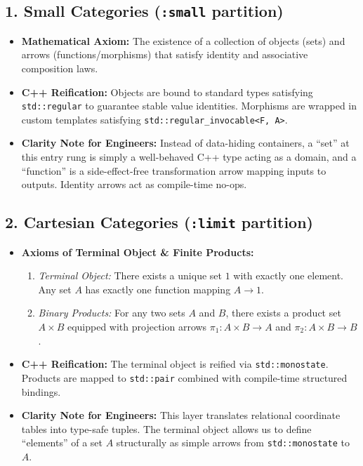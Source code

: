 \subsection{1. Small Categories (\texttt{:small} partition)}
\begin{itemize}
    \item \textbf{Mathematical Axiom:} The existence of a collection of objects (sets) and arrows (functions/morphisms) that satisfy identity and associative composition laws.
    \item \textbf{C++ Reification:} Objects are bound to standard types satisfying \texttt{std::regular} to guarantee stable value identities. Morphisms are wrapped in custom templates satisfying \texttt{std::regular\_invocable<F, A>}.
    \item \textbf{Clarity Note for Engineers:} Instead of data-hiding containers, a ``set'' at this entry rung is simply a well-behaved C++ type acting as a domain, and a ``function'' is a side-effect-free transformation arrow mapping inputs to outputs. Identity arrows act as compile-time no-ops.
\end{itemize}

\subsection{2. Cartesian Categories (\texttt{:limit} partition)}
\begin{itemize}
    \item \textbf{Axioms of Terminal Object \& Finite Products:} 
    \begin{enumerate}
        \item \textit{Terminal Object:} There exists a unique set $1$ with exactly one element. Any set $A$ has exactly one function mapping $A \to 1$.
        \item \textit{Binary Products:} For any two sets $A$ and $B$, there exists a product set $A \times B$ equipped with projection arrows $\pi_1: A \times B \to A$ and $\pi_2: A \times B \to B$.
    \end{enumerate}
    \item \textbf{C++ Reification:} The terminal object is reified via \texttt{std::monostate}. Products are mapped to \texttt{std::pair} combined with compile-time structured bindings.
    \item \textbf{Clarity Note for Engineers:} This layer translates relational coordinate tables into type-safe tuples. The terminal object allows us to define ``elements'' of a set $A$ structurally as simple arrows from \texttt{std::monostate} to $A$.
\end{itemize}

